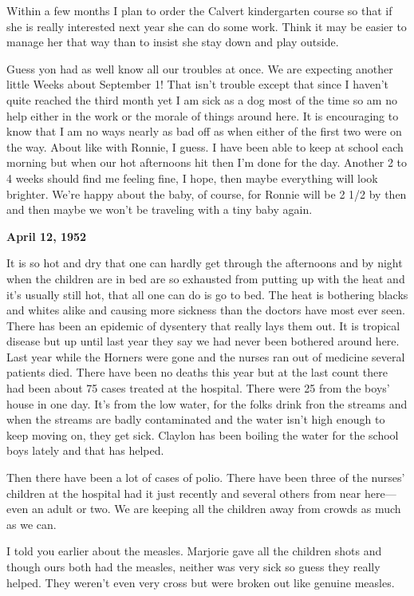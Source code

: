 \documentclass[]{book}
\begin{document}
Within a few months I plan to order the Calvert kindergarten course so that if she is really interested next year she can do some work. Think it may be easier to manage her that way than to insist she stay down and play outside.

Guess yon had as well know all our troubles at once. We are expecting another little Weeks about September 1! That isn't trouble except that since I haven't quite reached the third month yet I am sick as a dog most of the time so am no help either in the work or the morale of things around here. It is
encouraging to know that I am no ways nearly as bad off as when either of the first two were on the way. About like with Ronnie, I guess. I have been able to keep at school each morning but when our hot afternoons hit then I'm done for the day. Another 2 to 4 weeks should find me feeling fine, I hope, then maybe everything will look brighter. We're happy about the baby, of course, for Ronnie will be 2 1/2 by then and then maybe we won't be traveling with a tiny baby again.

\textbf{April 12, 1952}

It is so hot and dry that one can hardly get through the afternoons and by night when the children are in bed are so exhausted from putting up with the heat and it's usually still hot, that all one can do is go to bed. The heat is bothering blacks and whites alike and causing more sickness than the doctors have most ever seen. There has been an epidemic of dysentery that really lays them out. It is tropical disease but up until last year they say we had never been bothered around here. Last year while the Horners were gone and the nurses ran out of medicine several patients died. There have been no deaths this year but at the last count there had been about 75 cases treated at the hospital. There were 25 from the boys' house in one day. It's from the low water, for the folks drink fron the streams and when the streams are badly contaminated and the water isn't high enough to keep moving on, they get sick. Claylon has been boiling the water for the school boys lately and that has helped.

Then there have been a lot of cases of polio. There have been three of the nurses' children at the hospital had it just recently and several others from near here---even an adult or two. We are keeping all the children away from crowds as much as we can.

I told you earlier about the measles. Marjorie gave all the children shots and though ours both had the measles, neither was very sick so guess they really helped. They weren't even very cross but were broken out like genuine measles.
\end{document}
